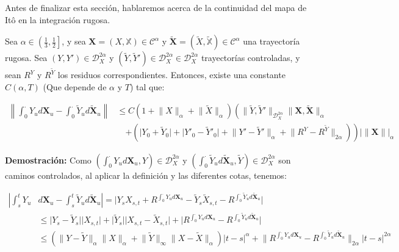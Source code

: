 Antes de finalizar esta sección, hablaremos acerca de la continuidad del mapa de Itô en la integración rugosa.

\begin{coro}
	Sea $\alpha \in \left( \frac{1}{3}, \frac{1}{2} \right]$, y sea $\mathbf{X} = (X, \mathbb{X}) \in \mathscr{C}^{\alpha}$ y $\tilde{  \mathbf{X} } = (\tilde{X}, \tilde{ \mathbb{X} }) \in \mathscr{C}^{\alpha}$ una trayectoría rugosa. Sea $(Y, Y') \in \mathscr{D}_X^{2 \alpha}$ y $(\tilde{Y}, \tilde{Y}') \in \mathscr{D}_X^{2 \alpha} \in \mathscr{D}_X^{2\alpha}$ trayectorías controladas, y sean $R^Y$ y $R^{\tilde{Y}}$ los residuos correspondientes. Entonces, existe una constante $C(\alpha, T)$ (Que depende de $\alpha$ y $T$) tal que:

	\begin{align*}
		\left\lVert \int_0^{\cdot} Y_u d\mathbf{X}_u - \int_0^{\cdot} \tilde{Y}_u d \tilde{ \mathbf{X} }_u \right\rVert &\leq C \left( 1 + \lVert X \rVert_{\alpha} + \lVert \tilde{X} \rVert_{\alpha} \right) \left(  \lVert \tilde{Y}, \tilde{Y}' \rVert_{ \mathscr{D}^{2\alpha}_X  } \lVert \mathbf{X}, \tilde{ \mathbf{X} } \rVert_{ \alpha } \right. \\
		& \quad \left. + \left(  \lvert Y_0 + \tilde{Y}_0 \rvert + \lvert Y'_0 - \tilde{Y}'_0 \rvert + \lVert Y' - \tilde{Y}' \rVert_{\alpha} + \lVert R^Y - R^{\tilde{Y}} \rVert_{2 \alpha} \right) \right) \lvert \lVert \mathbf{X} \rVert \rvert_{\alpha}
	\end{align*}

\end{coro}

\textbf{Demostración:} Como $( \int_0^{\cdot} Y_u d \textbf{X}_u, Y ) \in \mathscr{D}_X^{2 \alpha}$ y $( \int_0^{\cdot} \tilde{Y}_u d \tilde{ \mathbf{X} }_u, \tilde{Y} ) \in \mathscr{D}^{2 \alpha}_X$ son caminos controlados, al aplicar la definición y las diferentes cotas, tenemos:

\begin{align*}
	\left\lvert   \int_s^t Y_u \right. &  \left. d \mathbf{X}_u - \int_s^t \tilde{Y}_u d \tilde{ \mathbf{X} }_u \right \rvert = \lvert Y_s X_{s,t} + R^{\int_0^{\cdot} Y_u d \mathbf{X}_u } - \tilde{Y}_s \tilde{X}_{s,t} - R^{ \int_0^{\cdot} \tilde{Y}_u d \tilde{ \mathbf{X} }_u } \rvert \\
	&\leq \lvert Y_s - \tilde{Y}_s \rvert \lvert X_{s,t} \rvert + \lvert \tilde{Y}_s \rvert \lvert X_{s,t} - \tilde{X}_{s,t} \rvert + \lvert R^{\int_0^{\cdot} Y_u d \mathbf{X}_u } - R^{ \int_0^{\cdot} \tilde{Y}_u d \tilde{ \mathbf{X} }_u } \rvert\\
	&\leq \left(   \lVert Y - \tilde{Y} \rVert_{\alpha} \lVert X \rVert_{\alpha} + \lVert \tilde{Y} \rVert_{\infty} \lVert X - \tilde{X} \rVert_{\alpha} \right) \lvert t - s \rvert^{\alpha} + \lVert  R^{\int_0^{\cdot} Y_u d \mathbf{X}_u } - R^{ \int_0^{\cdot} \tilde{Y}_u d \tilde{ \mathbf{X} }_u } \rVert_{2 \alpha} \lvert t - s \rvert^{2 \alpha}
\end{align*}


